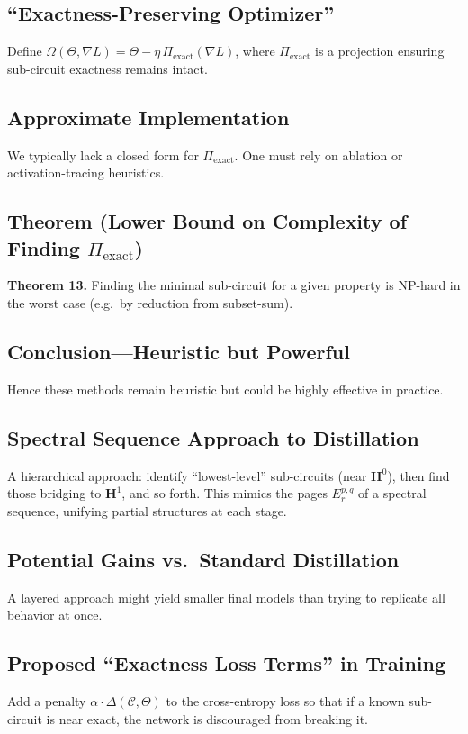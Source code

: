 \documentclass{article}
\begin{document}
\subsection{“Exactness-Preserving Optimizer”}
Define $\Omega(\Theta, \nabla L) = \Theta - \eta\,\Pi_{\mathrm{exact}}(\nabla L)$, where $\Pi_{\mathrm{exact}}$ is a projection ensuring sub-circuit exactness remains intact.

\subsection{Approximate Implementation}
We typically lack a closed form for $\Pi_{\mathrm{exact}}$. One must rely on ablation or activation-tracing heuristics.

\subsection{Theorem (Lower Bound on Complexity of Finding $\Pi_{\mathrm{exact}}$)}
\textbf{Theorem 13.}  
Finding the minimal sub-circuit for a given property is NP-hard in the worst case (e.g.\ by reduction from subset-sum).

\subsection{Conclusion—Heuristic but Powerful}
Hence these methods remain heuristic but could be highly effective in practice.

\subsection{Spectral Sequence Approach to Distillation}
A hierarchical approach: identify “lowest-level” sub-circuits (near $\mathbf{H}^0$), then find those bridging to $\mathbf{H}^1$, and so forth. This mimics the pages $E_r^{p,q}$ of a spectral sequence, unifying partial structures at each stage.

\subsection{Potential Gains vs.\ Standard Distillation}
A layered approach might yield smaller final models than trying to replicate all behavior at once.

\subsection{Proposed “Exactness Loss Terms” in Training}
Add a penalty $\alpha \cdot \Delta(\mathcal{C}, \Theta)$ to the cross-entropy loss so that if a known sub-circuit is near exact, the network is discouraged from breaking it.
\end{document}
